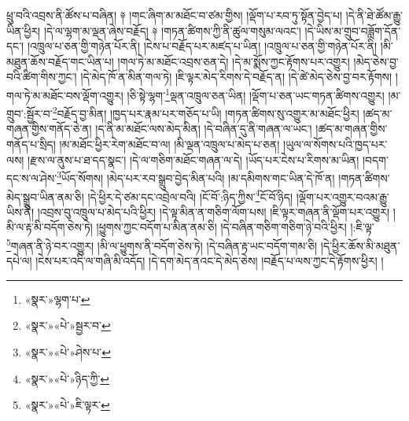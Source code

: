 ཕྲུ་བའི་འབྲས་ནི་ཚོས་པ་བཞིན། ༈ །གང་ཞིག་མ་མཐོང་བ་ཙམ་གྱིས། །ལྡོག་པ་རབ་ཏུ་སྟོན་བྱེད་པ། །དེ་ནི་ཐེ་ཚོམ་རྒྱུ་ཡིན་ཕྱིར། །དེ་ལ་ལྷག་མ་ལྡན་ཞེས་བརྗོད། ༈ །གཏན་ཚིགས་ཀྱི་ནི་ཚུལ་གསུམ་ལའང་། །དེ་ཡིས་མ་གྲུབ་བཟློག་དོན་དང་། །འཁྲུལ་པ་ཅན་གྱི་གཉེན་པོར་ནི། །ངེས་པ་བརྗོད་པར་མཛད་པ་ཡིན། །འཁྲུལ་པ་ཅན་གྱི་གཉེན་པོར་ནི། །མི་མཐུན་ཆོས་བརྗོད་གང་ཡིན་པ། །གལ་ཏེ་མ་མཐོང་འབྲས་ཅན་དེ། །དེ་མ་སྨོས་ཀྱང་རྟོགས་པར་འགྱུར། །མེད་ཅེས་བྱ་བའི་ཚིག་གིས་ཀྱང་། །དེ་མེད་ཁོ་ན་མིན་གལ་ཏེ། །ཇི་ལྟར་མེད་རིགས་དེ་བརྗོད་ན། །དེ་ཚེ་མེད་ཅེས་བྱ་བར་རྟོགས། །གལ་ཏེ་མ་མཐོང་བས་ལྡོག་འགྱུར། །ཅི་སྟེ་ལྷག་\footnote{«སྣར་»ལྷག་པ་}ལྡན་འཁྲུལ་ཅན་ཡིན། །ལྡོག་པ་ཅན་ཡང་གཏན་ཚིགས་འགྱུར། །མ་གྲུབ་:སྦྱོར་བ་\footnote{«སྣར་»«པེ་»སྦྱར་བ་}བརྗོད་བྱ་མིན། །ཁྱད་པར་རྣམ་པར་གཅོད་པ་ཡི། །གཏན་ཚིགས་སུ་འགྱུར་མ་མཐོང་ཕྱིར། །ཚད་མ་གཞན་གྱིས་གནོད་ཅེ་ན། །ད་ནི་མ་མཐོང་ལས་མེད་མིན། །དེ་བཞིན་དུ་ནི་གཞན་ལ་ཡང་། །ཚད་མ་གཞན་གྱིས་གནོད་པ་སྲིད། །མ་མཐོང་ཕྱིར་རེག་མཐོང་བ་ལ། །མི་ལྡན་འཁྲུལ་པ་མེད་པ་ཅན། །ཡུལ་ལ་སོགས་པའི་ཁྱད་པར་ལས། །རྫས་ལ་ནུས་པ་ཐ་དད་སྣང་། །དེ་ལ་གཅིག་མཐོང་གཞན་ལ་དེ། །ཡོད་པར་ངེས་པ་རིགས་མ་ཡིན། །བདག་དང་ས་ལ་ཤེས་\footnote{«སྣར་»«པེ་»ཤེས་པ་}ཡོད་སོགས། །མེད་པར་རབ་སྒྲུབ་བྱེད་མིན་པའི། །མ་དམིགས་གང་ཡིན་དེ་ཁོ་ན། །གཏན་ཚིགས་མེད་སྒྲུབ་ཡིན་ནམ་ཅི། །དེ་ཕྱིར་དེ་ཙམ་དང་འབྲེལ་བའི། །ངོ་བོ་:ཉིད་ཀྱིས་\footnote{«སྣར་»«པེ་»ཉིད་ཀྱི་}ངོ་བོ་ཉིད། །ལྡོག་པར་འགྱུར་བའམ་རྒྱུ་ཡིས་ནི། །འབྲས་བུ་འཁྲུལ་པ་མེད་པའི་ཕྱིར། །དེ་ལྟ་མིན་ན་གཅིག་ལོག་པས། །ཇི་ལྟར་གཞན་ནི་ལྡོག་པར་འགྱུར། །མི་ལ་རྟ་མི་བདོག་ཅེས་ཏེ། །ཕྱུགས་ཀྱང་བདོག་པ་མིན་ནམ་ཅི། །དེ་བཞིན་གཅིག་གཅིག་ཉེ་བའི་ཕྱིར། །:ཇི་ལྟ་\footnote{«སྣར་»«པེ་»ཇི་ལྟར་}གཞན་ནི་ཉེ་བར་འགྱུར། །མི་ལ་ཕྱུགས་ནི་བདོག་ཅེས་ཏེ། །དེ་བཞིན་རྟ་ཡང་བདོག་གམ་ཅི། །དེ་ཕྱིར་ཆོས་མི་མཐུན་དཔེ་ལ། །ངེས་པར་འདི་ལ་གཞི་མི་འདོད། །དེ་དག་མེད་ནའང་དེ་མེད་ཅེས། །བརྗོད་པ་ལས་ཀྱང་དེ་རྟོགས་ཕྱིར། །
